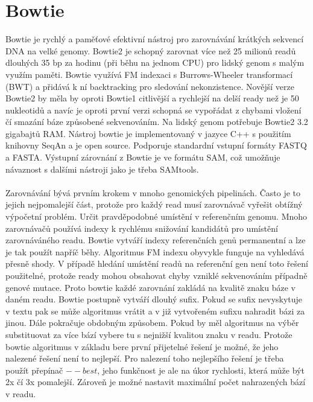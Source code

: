 \documentclass[czech,DP]{thesiskiv}
\numberwithin{equation}{section}
\begin{document}
\section{Bowtie}
Bowtie je rychlý a paměťové efektivní nástroj pro zarovnávání krátkých sekvencí DNA na velké genomy. Bowtie2 je schopný zarovnat více než 25 milionů readů dlouhých 35 bp za hodinu (při běhu na jednom CPU) pro lidský genom s malým využím paměti. Bowtie využívá FM indexaci s Burrows-Wheeler transformací (BWT) a přidává k ní backtracking pro sledování nekonzistence. Novější verze Bowtie2 by měla by oproti Bowtie1 citlivější a rychlejší na delší ready než je 50 nukleotidů a navíc je oproti první verzi schopná se vypořádat z chybami vložení čí smazání báze způsobené sekvenováním. Na lidský genom potřebuje Bowtie2 3.2 gigabajtů RAM. Nástroj bowtie je implementovaný v jazyce C++ s použitím knihovny SeqAn a je open source. Podporuje standardní vstupní formáty FASTQ a FASTA.  Výstupní zárovnání z Bowtie je ve formátu SAM, což umožňuje návaznost s dalšími nástroji jako je třeba SAMtools. \cite{bowtie} \cite{bowtie2}   
\\
\\
Zarovnávání bývá prvním krokem v mnoho genomických pipelinách. Často je to jejich nejpomalejší část, protože pro každý read musí zarovnávač vyřešit obtížný výpočetní problém. Určit pravděpodobné umístění v referenčním genomu. Mnoho zarovnávačů používá indexy k rychlému snižování kandidátů pro umístění zarovnáváného readu. Bowtie vytváří indexy referenčních genů permanentní a lze je tak použít napříč běhy. Algoritmus FM indexu obyvykle funguje na vyhledává přesně shody. V případě hledání umístění readů na referenční gen není toto řešení použitelné, protože ready mohou obsahovat chyby vzniklé sekvenováním případně genové mutace. Proto bowtie každé zarovnání zakládá na kvalitě znaku báze v daném readu. Bowtie postupně vytváří dlouhý sufix. Pokud se sufix nevyskytuje v textu pak se může algoritmus vrátit a v již vytvořeném sufixu nahradit bázi za jinou. Dále pokračuje obdobným způsobem. Pokud by měl algoritmus na výběr substituovat za více bází vybere tu s nejnižší kvalitou znaku v readu. Protože bowtie algoritmus v základu bere první přijetelné řešení je možné, že jeho nalezené řešení není to nejlepší. Pro nalezení toho nejlepšího řešení je třeba použít přepínač $--best$, jeho funkčnost je ale na úkor rychlosti, která může být 2x čí 3x pomalejší. Zároveň je možné nastavit maximální počet nahrazených bází v readu. \cite{bowtie}
\\
\\
\end{document}
